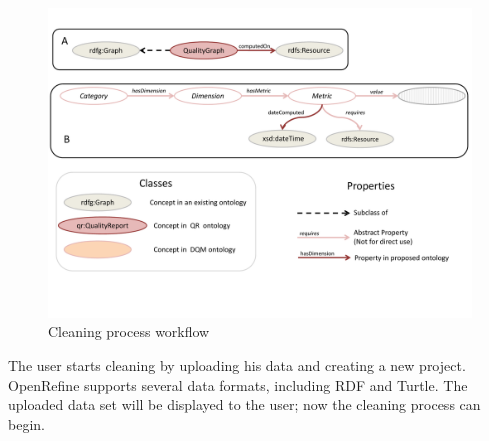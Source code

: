 \begin{figure}[ht!]
\centering
\includegraphics[page=14,trim=1.0cm 1.0cm 1.0cm 1.0cm,clip,width=\textwidth]{figures/cleaning.pdf}
\caption{Cleaning process workflow}
\label{fig:workflow}
\end{figure}

The user starts cleaning by uploading his data and creating a new project. OpenRefine supports several data formats, including RDF and Turtle. The uploaded data set will be displayed to the user; now the cleaning process can begin.

